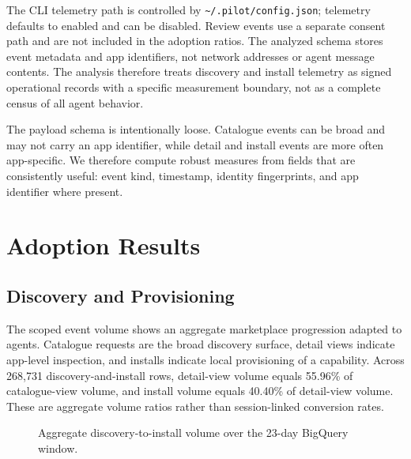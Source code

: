 \documentclass[10pt,twocolumn]{article}
\begin{document}
The CLI telemetry path is controlled by \texttt{\textasciitilde/.pilot/config.json}; telemetry defaults to enabled and can be disabled. Review events use a separate consent path and are not included in the adoption ratios. The analyzed schema stores event metadata and app identifiers, not network addresses or agent message contents. The analysis therefore treats discovery and install telemetry as signed operational records with a specific measurement boundary, not as a complete census of all agent behavior.

The payload schema is intentionally loose. Catalogue events can be broad and may not carry an app identifier, while detail and install events are more often app-specific. We therefore compute robust measures from fields that are consistently useful: event kind, timestamp, identity fingerprints, and app identifier where present.

\section{Adoption Results}
\label{sec:results}

\subsection{Discovery and Provisioning}

The scoped event volume shows an aggregate marketplace progression adapted to agents. Catalogue requests are the broad discovery surface, detail views indicate app-level inspection, and installs indicate local provisioning of a capability. Across 268,731 discovery-and-install rows, detail-view volume equals 55.96\% of catalogue-view volume, and install volume equals 40.40\% of detail-view volume. These are aggregate volume ratios rather than session-linked conversion rates.

\begin{figure}[!htbp]
\centering
{}
\caption{Aggregate discovery-to-install volume over the 23-day BigQuery window.}
\label{fig:progression}
\end{figure}
\end{document}
